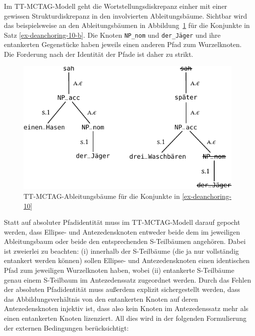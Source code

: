 Im TT-MCTAG-Modell geht die Wortstellungsdiskrepanz einher mit einer gewissen Strukturdiskrepanz in den involvierten Ableitungsbäume. Sichtbar wird das beispielsweise an den Ableitungsbäumen in Abbildung~\ref{fig-deanchoring-12} für die Konjunkte in Satz \ref{ex-deanchoring-10-b}. Die Knoten {\tt NP\_nom} und {\tt der\_Jäger} und ihre entankerten Gegenstücke haben jeweils einen anderen Pfad zum Wurzelknoten. Die Forderung nach der Identität der Pfade ist daher zu strikt. 
\begin{figure}[t]
\centering
\includegraphics{graphics/abb829.pdf}
\caption{\label{fig-deanchoring-12}TT-MCTAG-Ableitungsbäume für die Konjunkte in \ref{ex-deanchoring-10}}
\end{figure}
Statt auf absoluter Pfadidentität muss im TT-MCTAG-Modell darauf gepocht werden, dass Ellipse- und Antezedensknoten entweder beide dem  im jeweiligen Ableitungsbaum oder beide den entsprechenden S-Teilbäumen angehören. Dabei ist zweierlei zu beachten: (i) innerhalb der S-Teilbäume (die ja nur vollständig entankert werden können) sollen Ellipse- und Antezedensknoten einen identischen Pfad zum jeweiligen Wurzelknoten haben, wobei (ii) entankerte S-Teilbäume genau einem S-Teilbaum im Antezedenssatz zugeordnet werden. Durch das Fehlen der absoluten Pfadidentität muss au\ss erdem explizit sichergestellt werden, dass das Abbildungsverhältnis von den entankerten Knoten auf deren Antezedensknoten injektiv ist, dass also kein Knoten im Antezedenssatz mehr als einen entankerten Knoten lizenziert. All dies wird in der folgenden Formulierung der externen Bedingungen berücksichtigt:  

